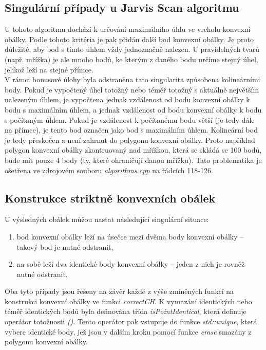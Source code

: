 \documentclass[a4paper,11pt,twoside]{article}
\begin{document}
\subsection{Singulární případy u Jarvis Scan algoritmu}
U tohoto algoritmu dochází k určování maximálního úhlu ve vrcholu konvexní obálky. Podle tohoto kritéria je pak přidán další bod konvexní obálky. Je proto důležité, aby bod s tímto úhlem vždy jednoznačně nalezen. U pravidelných tvarů (např. mřížka) je ale mnoho bodů, ke kterým z daného bodu určíme stejný úhel, jelikož leží na stejné přímce. \\
\indent V rámci bonusové úlohy byla odstraněna tato singularita způsobena kolineárními body. Pokud je vypočtený úhel totožný nebo téměř totožný s aktuálně největším nalezeným úhlem, je vypočtena jednak vzdálenost od bodu konvexní obálky k bodu s maximálním úhlem, a jednak vzdálenost od bodu konvexní obálky k bodu s počítaným úhlem. Pokud je vzdálenost k počítanému bodu větší (je tedy dále na přímce), je tento bod označen jako bod s maximálním úhlem. Kolineární bod je tedy přeskočen a není zahrnut do polygonu konvexní obálky. Proto například polygon konvexní obálky zkontruovaný nad mřížkou, která se skládá se 100 bodů, bude mít pouze 4 body (ty, které ohraničují danou mřížku). Tato problematika je ošetřena ve zdrojovém souboru \textit{algorithms.cpp} na řádcích 118-126.
\subsection{Konstrukce striktně konvexních obálek}
U výsledných obálek můžou nastat následující singulární situace: 
\begin{enumerate}
\item bod konvexní obálky leží na úsečce mezi dvěma body konvexní obálky -- takový bod je nutné odstranit, 
\item na sobě leží dva identické body konvexní obálky -- jeden z nich je rovněž nutné odstranit.
\end{enumerate}
Oba tyto případy jsou řešeny na závěr každé z výše zmíněných funkcí na konstrukci konvexní obálky ve funkci \textit{correctCH}. K vymazání identických nebo téměř identických bodů byla definována třída \textit{isPointIdentical}, která definuje operátor totožnosti \textit{()}. Tento operátor pak vstupuje do funkce \textit{std::unique}, která vybere identické body, jež jsou v dalším kroku pomocí funkce \textit{erase} smazány z polygonu konvexní obálky.
\end{document}
